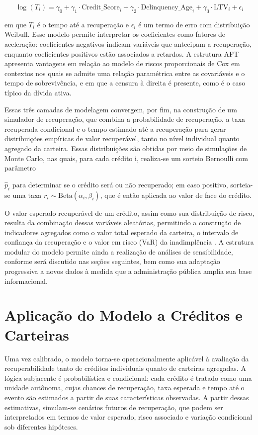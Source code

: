 \documentclass[a4paper,12pt]{article}
\begin{document}
\[ \log(T_i) = \gamma_0 + \gamma_1 \cdot \text{Credit\_Score}_i + \gamma_2 \cdot \text{Delinquency\_Age}_i + \gamma_3 \cdot \text{LTV}_i + \epsilon_i \]
 
em que $T_i$ é o tempo até a recuperação e $\epsilon_i$ é um termo de erro com distribuição Weibull. Esse modelo permite interpretar os coeficientes como fatores de aceleração: coeficientes negativos indicam variáveis que antecipam a recuperação, enquanto coeficientes positivos estão associados a retardos. A estrutura AFT apresenta vantagens em relação ao modelo de riscos proporcionais de Cox em contextos nos quais se admite uma relação paramétrica entre as covariáveis e o tempo de sobrevivência, e em que a censura à direita é presente, como é o caso típico da dívida ativa.

Essas três camadas de modelagem convergem, por fim, na construção de um simulador de recuperação, que combina a probabilidade de recuperação, a taxa recuperada condicional e o tempo estimado até a recuperação para gerar distribuições empíricas de valor recuperável, tanto no nível individual quanto agregado da carteira. Essas distribuições são obtidas por meio de simulações de Monte Carlo, nas quais, para cada crédito i, realiza-se um sorteio Bernoulli com parâmetro 

$\hat{p}_{i}$ para determinar se o crédito será ou não recuperado; em caso positivo, sorteia-se uma taxa $r_i \sim \text{Beta}(\alpha_i, \beta_i)$, que é então aplicada ao valor de face do crédito.

O valor esperado recuperável de um crédito, assim como sua distribuição de risco, resulta da combinação dessas variáveis aleatórias, permitindo a construção de indicadores agregados como o valor total esperado da carteira, o intervalo de confiança da recuperação e o valor em risco (VaR) da inadimplência \cite{bolder2018credit}. A estrutura modular do modelo permite ainda a realização de análises de sensibilidade, conforme será discutido nas seções seguintes, bem como sua adaptação progressiva a novos dados à medida que a administração pública amplia sua base informacional.


\section{Aplicação do Modelo a Créditos e Carteiras}
Uma vez calibrado, o modelo torna-se operacionalmente aplicável à avaliação da recuperabilidade tanto de créditos individuais quanto de carteiras agregadas. A lógica subjacente é probabilística e condicional: cada crédito é tratado como uma unidade autônoma, cujas chances de recuperação, taxa esperada e tempo até o evento são estimados a partir de suas características observadas. A partir dessas estimativas, simulam-se cenários futuros de recuperação, que podem ser interpretados em termos de valor esperado, risco associado e variação condicional sob diferentes hipóteses.
\end{document}
